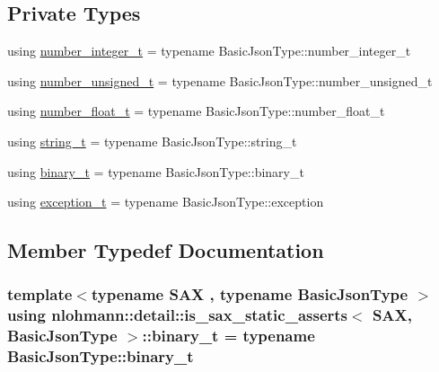 \subsection*{Private Types}
\begin{DoxyCompactItemize}
\item 
using \hyperlink{structnlohmann_1_1detail_1_1is__sax__static__asserts_a474adf99bf1eaa8292284fd3064c80fe}{number\+\_\+integer\+\_\+t} = typename Basic\+Json\+Type\+::number\+\_\+integer\+\_\+t
\item 
using \hyperlink{structnlohmann_1_1detail_1_1is__sax__static__asserts_af8733df7fcaebb25434285885db7f127}{number\+\_\+unsigned\+\_\+t} = typename Basic\+Json\+Type\+::number\+\_\+unsigned\+\_\+t
\item 
using \hyperlink{structnlohmann_1_1detail_1_1is__sax__static__asserts_a65d4be40c41ddc31fd2c3583d87d5faf}{number\+\_\+float\+\_\+t} = typename Basic\+Json\+Type\+::number\+\_\+float\+\_\+t
\item 
using \hyperlink{structnlohmann_1_1detail_1_1is__sax__static__asserts_a067c98d2145bb54d862f4794ac1287bb}{string\+\_\+t} = typename Basic\+Json\+Type\+::string\+\_\+t
\item 
using \hyperlink{structnlohmann_1_1detail_1_1is__sax__static__asserts_adb3ffd1849091f6edb5c2d6e650e4266}{binary\+\_\+t} = typename Basic\+Json\+Type\+::binary\+\_\+t
\item 
using \hyperlink{structnlohmann_1_1detail_1_1is__sax__static__asserts_a34e1bc8ab7adbbab5f7d8c45a964020b}{exception\+\_\+t} = typename Basic\+Json\+Type\+::exception
\end{DoxyCompactItemize}


\subsection{Member Typedef Documentation}
\subsubsection[{\texorpdfstring{binary\+\_\+t}{binary_t}}]{\setlength{\rightskip}{0pt plus 5cm}template$<$typename S\+AX , typename Basic\+Json\+Type $>$ using {\bf nlohmann\+::detail\+::is\+\_\+sax\+\_\+static\+\_\+asserts}$<$ S\+AX, Basic\+Json\+Type $>$\+::{\bf binary\+\_\+t} =  typename Basic\+Json\+Type\+::binary\+\_\+t\hspace{0.3cm}{\ttfamily [private]}}\hypertarget{structnlohmann_1_1detail_1_1is__sax__static__asserts_adb3ffd1849091f6edb5c2d6e650e4266}{}\label{structnlohmann_1_1detail_1_1is__sax__static__asserts_adb3ffd1849091f6edb5c2d6e650e4266}
